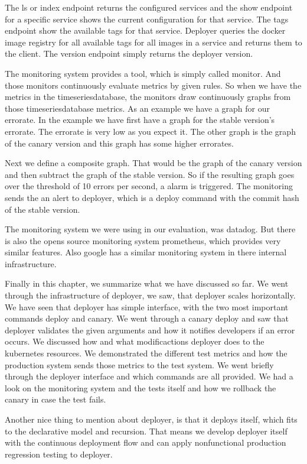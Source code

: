 The ls or index endpoint returns the configured services and the show endpoint for a
specific service shows the current configuration for that service. The tags endpoint show
the available tags for that service. Deployer queries the docker image registry for all
available tags for all images in a service and returns them to the client. The version
endpoint simply returns the deployer version.

The monitoring system provides a tool, which is simply called monitor. And those monitors
continuously evaluate metrics by given rules. So when we have the metrics in the
timeseriesdatabase, the monitors draw continuously graphs from those timeseriesdatabase
metrics. As an example we have a graph for our errorate. In the example we have first have
a graph for the stable version's errorate. The errorate is very low as you expect it. The
other graph is the graph of the canary version and this graph has some higher errorates.

Next we define a composite graph. That would be the graph of the canary version and then
subtract the graph of the stable version. So if the resulting graph goes over the
threshold of 10 errors per second, a alarm is triggered. The monitoring sends the an alert
to deployer, which is a deploy command with the commit hash of the stable version.

The monitoring system we were using in our evaluation, was datadog. But there is also the
opens source monitoring system prometheus, which provides very similar features. Also
google has a similar monitoring system in there internal infrastructure.

Finally in this chapter, we summarize what we have discussed so far. We went through the
infrastructure of deployer, we saw, that deployer scales horizontally. We have seen that
deployer has simple interface, with the two most important commands deploy and canary. We
went through a canary deploy and saw that deployer validates the given arguments and how
it notifies developers if an error occurs. We discussed how and what modificactions
deployer does to the kubernetes resources. We demonstrated the different test metrics and
how the production system sends those metrics to the test system. We went briefly through
the deployer interface and which commands are all provided. We had a look on the
monitoring system and the tests itself and how we rollback the canary in case the test
fails.

Another nice thing to mention about deployer, is that it deploys itself, which fits to the
declarative model and recursion. That means we develop deployer itself with the continuous
deployment flow and can apply nonfunctional production regression testing to deployer.

